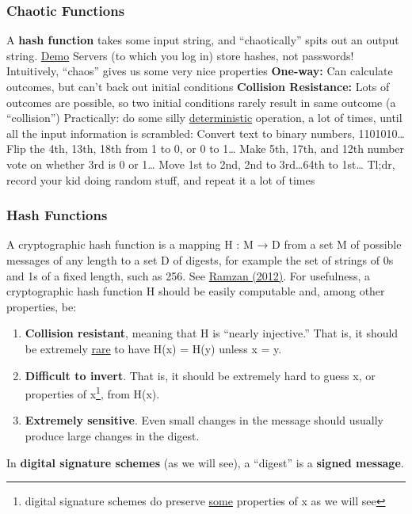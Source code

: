 \documentclass[aspectratio=169]{beamer}
\begin{document}
\begin{frame}
\frametitle{Chaotic Functions}

\bi
\m A \textbf{hash function} takes some input string, and ``chaotically'' spits out an output string. \href{https://emn178.github.io/online-tools/sha256.html}{Demo}
\m Servers (to which you log in) store hashes, not passwords! \pause 
\m Intuitively, ``chaos'' gives us some very nice properties
\bi
\m \textbf{One-way:} Can calculate outcomes, but can't back out initial conditions
\m \textbf{Collision Resistance:} Lots of outcomes are possible, so two initial conditions rarely result in same outcome (a ``collision'') 
\ei \pause
\m Practically: do some silly \ul{deterministic} operation, a lot of times, until all the input information is scrambled:
\bi
\m Convert text to binary numbers, 1101010\ldots
\m Flip the 4th, 13th, 18th from 1 to 0, or 0 to 1\ldots
\m Make 5th, 17th, and 12th number vote on whether 3rd is 0 or 1\ldots
\m Move 1st to 2nd, 2nd to 3rd\ldots 64th to 1st\ldots
\ei \pause
\m Tl;dr, record your kid doing random stuff, and repeat it a lot of times
\ei

\end{frame}

\begin{frame}\frametitle{Hash Functions}

A cryptographic hash function is a mapping H : M → D from a set M of possible messages of any length to a set D of digests, for example the set of strings of 0s and 1s of a fixed length, such as 256. See \href{https://www.youtube.com/watch?v=0WiTaBI82Mc}{Ramzan (2012)}. 
\vfill \pause 
For usefulness, a cryptographic hash function H should be easily computable and, among other properties, be: 
\begin{enumerate}
    \item \textbf{Collision resistant}, meaning that H is “nearly injective.” That is, it should be extremely \ul{rare} to have H(x) = H(y) unless x = y.\pause 
    \item \textbf{Difficult to invert}. That is, it should be extremely hard to guess x, or properties of x\footnote{digital signature schemes do preserve \ul{some} properties of x as we will see}, from H(x).\pause 
    \item \textbf{Extremely sensitive}. Even small changes in the message should usually produce large changes in the digest.  \pause 
\end{enumerate}
In \textbf{digital signature schemes} (as we will see), a ``digest'' is a \textbf{signed message}. 
\end{frame}
\end{document}
